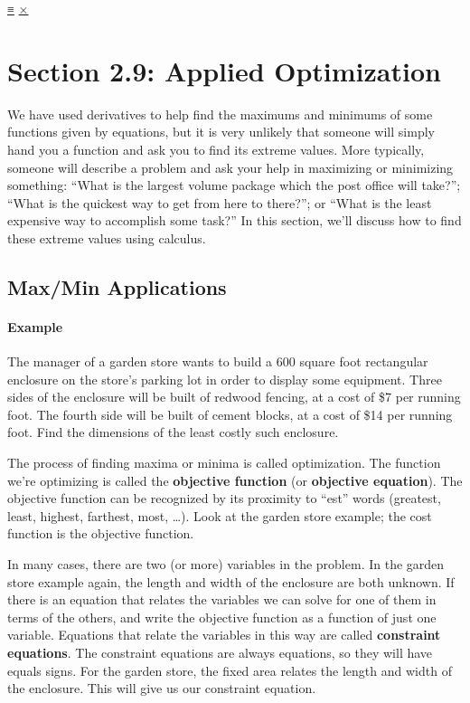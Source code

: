 \protect\hyperlink{main-nav}{≡} \protect\hyperlink{close-nav}{×}

\hypertarget{section-2.9-applied-optimization}{%
\section{Section 2.9: Applied
Optimization}\label{section-2.9-applied-optimization}}

We have used derivatives to help find the maximums and minimums of some
functions given by equations, but it is very unlikely that someone will
simply hand you a function and ask you to find its extreme values. More
typically, someone will describe a problem and ask your help in
maximizing or minimizing something: ``What is the largest volume package
which the post office will take?''; ``What is the quickest way to get
from here to there?''; or ``What is the least expensive way to
accomplish some task?'' In this section, we'll discuss how to find these
extreme values using calculus.

\hypertarget{maxmin-applications}{%
\subsection{Max/Min Applications}\label{maxmin-applications}}

\hypertarget{example}{%
\paragraph{Example}\label{example}}

The manager of a garden store wants to build a 600 square foot
rectangular enclosure on the store's parking lot in order to display
some equipment. Three sides of the enclosure will be built of redwood
fencing, at a cost of \$7 per running foot. The fourth side will be
built of cement blocks, at a cost of \$14 per running foot. Find the
dimensions of the least costly such enclosure.

The process of finding maxima or minima is called optimization. The
function we're optimizing is called the \textbf{objective function} (or
\textbf{objective equation}). The objective function can be recognized
by its proximity to ``est'' words (greatest, least, highest, farthest,
most, \ldots{}). Look at the garden store example; the cost function is
the objective function.

In many cases, there are two (or more) variables in the problem. In the
garden store example again, the length and width of the enclosure are
both unknown. If there is an equation that relates the variables we can
solve for one of them in terms of the others, and write the objective
function as a function of just one variable. Equations that relate the
variables in this way are called \textbf{constraint equations}. The
constraint equations are always equations, so they will have equals
signs. For the garden store, the fixed area relates the length and width
of the enclosure. This will give us our constraint equation.

